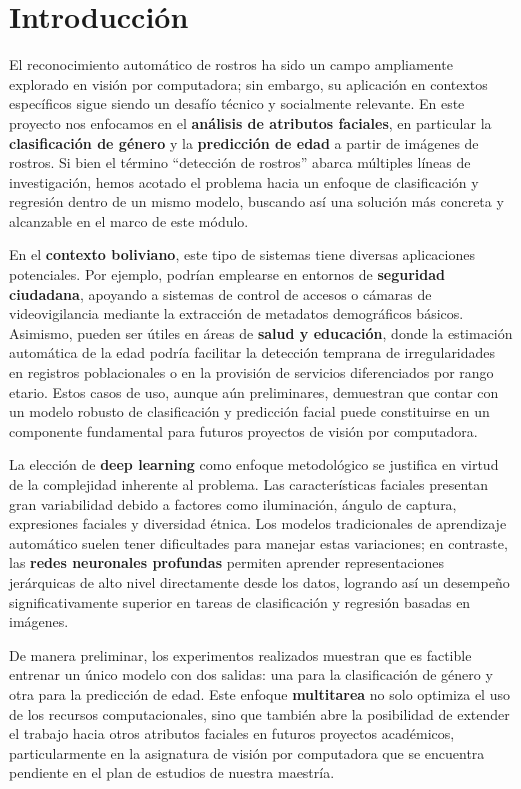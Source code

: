 \section{Introducción}


El reconocimiento automático de rostros ha sido un campo ampliamente explorado en visión por computadora; sin embargo, su aplicación en contextos específicos sigue siendo un desafío técnico y socialmente relevante. En este proyecto nos enfocamos en el \textbf{análisis de atributos faciales}, en particular la \textbf{clasificación de género} y la \textbf{predicción de edad} a partir de imágenes de rostros. Si bien el término ``detección de rostros'' abarca múltiples líneas de investigación, hemos acotado el problema hacia un enfoque de clasificación y regresión dentro de un mismo modelo, buscando así una solución más concreta y alcanzable en el marco de este módulo.

En el \textbf{contexto boliviano}, este tipo de sistemas tiene diversas aplicaciones potenciales. Por ejemplo, podrían emplearse en entornos de \textbf{seguridad ciudadana}, apoyando a sistemas de control de accesos o cámaras de videovigilancia mediante la extracción de metadatos demográficos básicos. Asimismo, pueden ser útiles en áreas de \textbf{salud y educación}, donde la estimación automática de la edad podría facilitar la detección temprana de irregularidades en registros poblacionales o en la provisión de servicios diferenciados por rango etario. Estos casos de uso, aunque aún preliminares, demuestran que contar con un modelo robusto de clasificación y predicción facial puede constituirse en un componente fundamental para futuros proyectos de visión por computadora.

La elección de \textbf{deep learning} como enfoque metodológico se justifica en virtud de la complejidad inherente al problema. Las características faciales presentan gran variabilidad debido a factores como iluminación, ángulo de captura, expresiones faciales y diversidad étnica. Los modelos tradicionales de aprendizaje automático suelen tener dificultades para manejar estas variaciones; en contraste, las \textbf{redes neuronales profundas} permiten aprender representaciones jerárquicas de alto nivel directamente desde los datos, logrando así un desempeño significativamente superior en tareas de clasificación y regresión basadas en imágenes.

De manera preliminar, los experimentos realizados muestran que es factible entrenar un único modelo con dos salidas: una para la clasificación de género y otra para la predicción de edad. Este enfoque \textbf{multitarea} no solo optimiza el uso de los recursos computacionales, sino que también abre la posibilidad de extender el trabajo hacia otros atributos faciales en futuros proyectos académicos, particularmente en la asignatura de visión por computadora que se encuentra pendiente en el plan de estudios de nuestra maestría.

